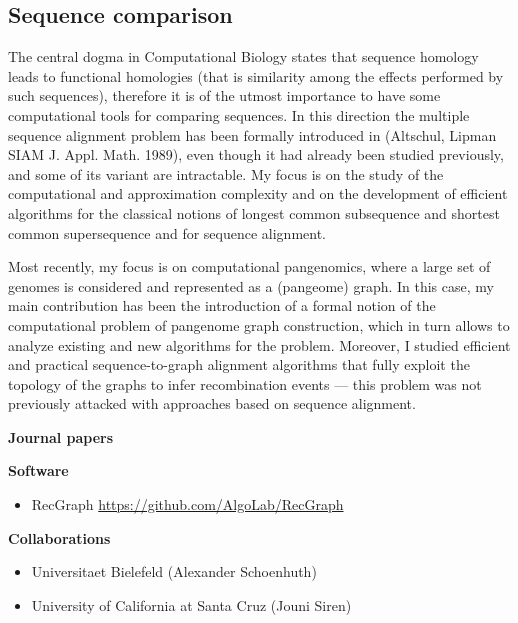 \documentclass[11pt,a4paper,roman]{moderncv}
\begin{document}
\subsection{Sequence comparison}\label{sequence-comparison}

The central dogma in Computational Biology states that sequence homology
leads to functional homologies (that is similarity among the effects
performed by such sequences), therefore it is of the utmost importance
to have some computational tools for comparing sequences. In this
direction the multiple sequence alignment problem has been formally
introduced in (Altschul, Lipman SIAM J. Appl. Math. 1989), even though
it had already been studied previously, and some of its variant are
intractable. My focus is on the study of the computational and approximation
complexity and on the development of efficient algorithms for the classical
notions of longest common subsequence and shortest common supersequence and for
sequence alignment.

Most recently, my focus is on computational pangenomics, where a large set of
genomes is considered and represented as a (pangeome) graph.
In this case, my main contribution has been the introduction of a formal notion of the computational
problem of pangenome graph construction, which in turn allows to analyze
existing and new algorithms for the problem.
Moreover, I studied efficient and practical
sequence-to-graph alignment algorithms that fully exploit the topology of the
graphs to infer recombination events --- this problem was not previously
attacked with approaches based on sequence alignment.


\textbf{Journal papers}

\cite{baaijensComputationalGraphPangenomics2022}
\cite{DBLP:journals/bioinformatics/DentiPPCVRB21}
\cite{DBLP:journals/ipl/BonizzoniVDP10}
\cite{DBLP:journals/tcbb/BonizzoniVDFRV07}
\cite{DBLP:journals/informs/JustV04}
\cite{DBLP:journals/dam/BonizzoniVM01}
\cite{DBLP:journals/tcs/BonizzoniV01}

\textbf{Software}

\begin{itemize}
\item
      RecGraph \url{https://github.com/AlgoLab/RecGraph}
\end{itemize}

\textbf{Collaborations}

\begin{itemize}
\item
      Universitaet Bielefeld (Alexander Schoenhuth)
\item
      University of California at Santa Cruz (Jouni Siren)
\end{itemize}
\end{document}
